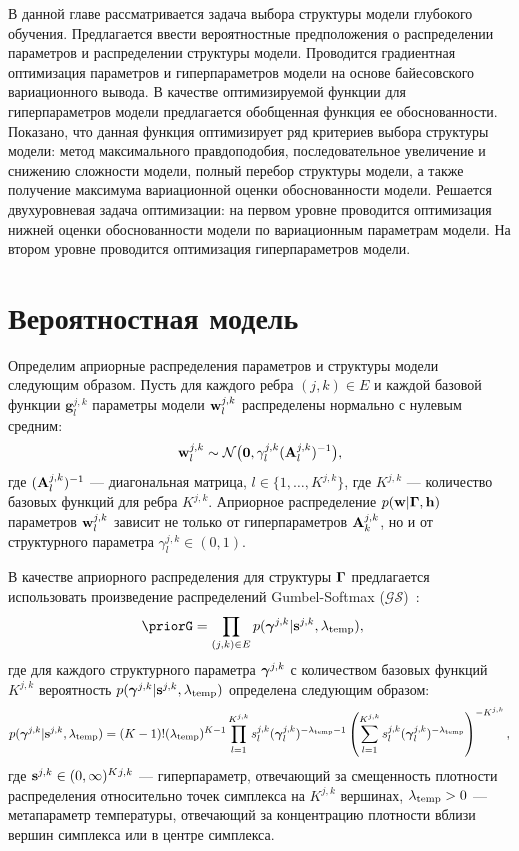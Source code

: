 В данной главе рассматривается задача выбора структуры модели глубокого обучения. Предлагается ввести вероятностные предположения о распределении параметров и распределении структуры модели. 
Проводится градиентная оптимизация параметров и гиперпараметров модели на основе байесовского вариационного вывода.  В качестве оптимизируемой функции для гиперпараметров модели предлагается обобщенная функция ее обоснованности. Показано, что данная функция оптимизирует ряд критериев выбора структуры модели: метод максимального правдоподобия, последовательное увеличение и снижению сложности модели, полный перебор структуры модели, а также получение максимума вариационной оценки обоснованности модели. Решается двухуровневая задача оптимизации: на первом уровне проводится оптимизация нижней оценки обоснованности модели по вариационным параметрам модели. На втором уровне проводится оптимизация гиперпараметров модели.

\section{Вероятностная модель}
Определим априорные распределения параметров и структуры модели следующим образом.
Пусть для каждого ребра $(j,k) \in E$ и каждой базовой функции $\mathbf{g}^{j,k}_l$ параметры модели $\mathbf{w}^{j,k}_l$ распределены нормально с нулевым средним:
\[
    \mathbf{w}^{j,k}_l \sim \mathcal{N}\bigl(\mathbf{0}, \gamma^{j,k}_l(\mathbf{A}^{j,k}_l)^{-1}\bigr),
\]
где $ (\mathbf{A}^{j,k}_l)^{-1}$ --- диагональная матрица, $l \in \{1,\dots,K^{j,k}\}$, где $K^{j,k}$ --- количество базовых функций для ребра $K^{j,k}$. Априорное распределение $p(\mathbf{w}|\boldsymbol{\Gamma}, \mathbf{h})$ параметров $\mathbf{w}^{j,k}_l$ зависит не только от гиперпараметров $\mathbf{A}_k^{j,k}$, но и от структурного параметра $\gamma^{j,k}_l \in (0,1)$.


В качестве априорного распределения для структуры $\boldsymbol{\Gamma}$ предлагается использовать произведение распределений Gumbel-Softmax ($\mathcal{GS}$)~\cite{gs}:
\[
    \priorG = \prod_{(j,k) \in E} p(\g^{j,k}|\s^{j,k}, \lamT), \quad 
\]
где для каждого структурного параметра $\boldsymbol{\gamma}^{j,k}$ с количеством базовых функций $K^{j,k}$ вероятность $p(\boldsymbol{\gamma}^{j,k}|\mathbf{s}^{j,k}, \lambda_{\text{temp}})$ определена следующим образом:
\[
    p(\boldsymbol{\gamma}^{j,k}|\mathbf{s}^{j,k}, \lambda_{\text{temp}}) = (K-1)!(\lambda_{\text{temp}})^{K-1}\prod_{l=1}^{K^{j,k}} s^{j,k}_l(\boldsymbol{\gamma}^{j,k}_l)^{-\lambda_{\text{temp}} -1} \left(\sum_{l=1}^{K^{j,k}} s^{j,k}_l(\boldsymbol{\gamma}^{j,k}_l)^{-\lambda_{\text{temp}}}\right)^{-K^{j,k}},
\]
где $\mathbf{s}^{j,k} \in (0,\infty)^K{^{j,k}}$ --- гиперпараметр, отвечающий за смещенность плотности распределения относительно точек симплекса на $K^{j,k}$ вершинах, $\lambda_{\text{temp}} > 0$ --- метапараметр температуры, отвечающий за концентрацию плотности вблизи вершин симплекса или в центре симплекса.

